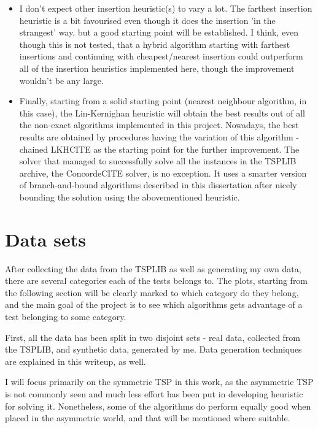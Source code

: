 \documentclass[12pt,twoside,notitlepage]{report}
\begin{document}
\begin{itemize}
\item I don't expect other insertion heuristic(s) to vary a lot. The farthest insertion heuristic is a bit favourised even though it does the insertion 'in the strangest' way, but a good starting point will be established. I think, even though this is not tested, that a hybrid algorithm starting with farthest insertions and continuing with cheapest/nearest insertion could outperform all of the insertion heuristics implemented here, though the improvement wouldn't be any large.

\item Finally, starting from a solid starting point (nearest neighbour algorithm, in this case), the Lin-Kernighan heuristic will obtain the best results out of all the non-exact algorithms implemented in this project. Nowadays, the best results are obtained by procedures having the variation of this algorithm - chained LKHCITE as the starting point for the further improvement. The solver that managed to successfully solve all the instances in the TSPLIB archive, the ConcordeCITE solver, is no exception. It uses a smarter version of branch-and-bound algorithms described in this dissertation after nicely bounding the solution using the abovementioned heuristic.

\end{itemize}

\section{Data sets}

After collecting the data from the TSPLIB as well as generating my own data, there are several categories each of the tests belongs to. The plots, starting from the following section will be clearly marked to which category do they belong, and the main goal of the project is to see which algorithms gets advantage of a test belonging to some category.

First, all the data has been split in two disjoint sets - real data, collected from the TSPLIB, and synthetic data, generated by me. Data generation techniques are explained in this writeup, as well.

I will focus primarily on the symmetric TSP in this work, as the asymmetric TSP is not commonly seen and much less effort has been put in developing heuristic for solving it. Nonetheless, some of the algorithms do perform equally good when placed in the asymmetric world, and that will be mentioned where suitable.
\end{document}
